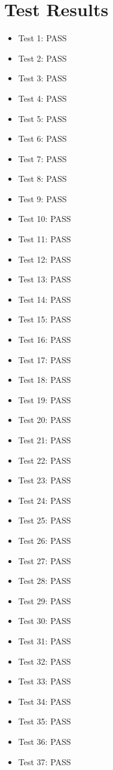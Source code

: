 \documentclass[english,12pt]{scrartcl}
\begin{document}
\section{Test Results}
	\begin{itemize}
                \item Test 1: PASS
                \item Test 2: PASS
                \item Test 3: PASS
                \item Test 4: PASS
                \item Test 5: PASS
                \item Test 6: PASS
                \item Test 7: PASS
                \item Test 8: PASS
                \item Test 9: PASS
                \item Test 10: PASS
                \item Test 11: PASS
                \item Test 12: PASS
                \item Test 13: PASS
                \item Test 14: PASS
                \item Test 15: PASS
                \item Test 16: PASS
                \item Test 17: PASS
                \item Test 18: PASS
                \item Test 19: PASS
                \item Test 20: PASS
                \item Test 21: PASS
                \item Test 22: PASS
                \item Test 23: PASS
                \item Test 24: PASS
                \item Test 25: PASS
                \item Test 26: PASS
                \item Test 27: PASS
                \item Test 28: PASS
                \item Test 29: PASS
                \item Test 30: PASS
                \item Test 31: PASS
                \item Test 32: PASS
                \item Test 33: PASS
                \item Test 34: PASS
                \item Test 35: PASS
                \item Test 36: PASS
                \item Test 37: PASS
	\end{itemize}
		
\end{document}
